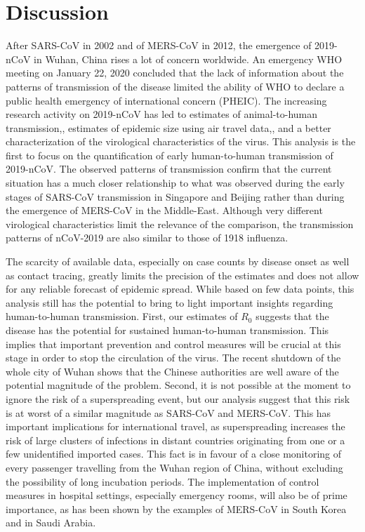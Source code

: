\documentclass{article}
\begin{document}
\section*{Discussion}

After SARS-CoV in 2002 and of MERS-CoV in 2012, the emergence of 2019-nCoV in Wuhan, China rises a lot of concern worldwide.
An emergency WHO meeting on January 22, 2020 concluded that the lack of information about the patterns of transmission of the disease limited the ability of WHO to declare a public health emergency of international concern (PHEIC).\cite{whoreco}
The increasing research activity on 2019-nCoV has led to estimates of animal-to-human transmission,\cite{Chen2020.01.19.911669}, estimates of epidemic size using air travel data,\cite{Imai:2020, vespi:2020}, and a better characterization of the virological characteristics of the virus.\cite{Shi:2020}
This analysis is the first to focus on the quantification of early human-to-human transmission of 2019-nCoV.
The observed patterns of transmission confirm that the current situation has a much closer relationship to what was observed during the early stages of SARS-CoV transmission in Singapore and Beijing rather than during the emergence of MERS-CoV in the Middle-East.\cite{Lloyd-Smith:2005,Kucharski:2015b}
Although very different virological characteristics limit the relevance of the comparison, the transmission patterns of nCoV-2019 are also similar to those of 1918 influenza.

The scarcity of available data, especially on case counts by disease onset as well as contact tracing, greatly limits the precision of the estimates and does not allow for any reliable forecast of epidemic spread.
While based on few data points, this analysis still has the potential to bring to light important insights regarding human-to-human transmission.
First, our estimates of $R_0$ suggests that the disease has the potential for sustained human-to-human transmission.
This implies that important prevention and control measures will be crucial at this stage in order to stop the circulation of the virus.
The recent shutdown of the whole city of Wuhan shows that the Chinese authorities are well aware of the potential magnitude of the problem.
Second, it is not possible at the moment to ignore the risk of a superspreading event, but our analysis suggest that this risk is at worst of a similar magnitude as SARS-CoV and MERS-CoV.
This has important implications for international travel, as superspreading increases the risk of large clusters of infections in distant countries originating from one or a few unidentified imported cases.
This fact is in favour of a close monitoring of every passenger travelling from the Wuhan region of China, without excluding the possibility of long incubation periods.
The implementation of control measures in hospital settings, especially emergency rooms, will also be of prime importance, as has been shown by the examples of MERS-CoV in South Korea\cite{oh2015middle} and in Saudi Arabia.\cite{assiri2013hospital} 
\end{document}
